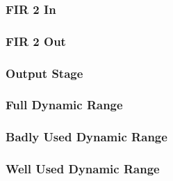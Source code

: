 \begin{frame}
    \frametitle{FIR 2 In}

    \centering
    
    
\end{frame}

\begin{frame}
    \frametitle{FIR 2 Out}

    \centering
    
    
\end{frame}

\begin{frame}
    \frametitle{Output Stage}

    \centering
    
    
\end{frame}

\begin{frame}
    \frametitle{Full Dynamic Range}

    \centering
    
    
\end{frame}

\begin{frame}
    \frametitle{Badly Used Dynamic Range}

    \centering
    
    
\end{frame}

\begin{frame}
    \frametitle{Well Used Dynamic Range}

    \centering
    
    
\end{frame}
